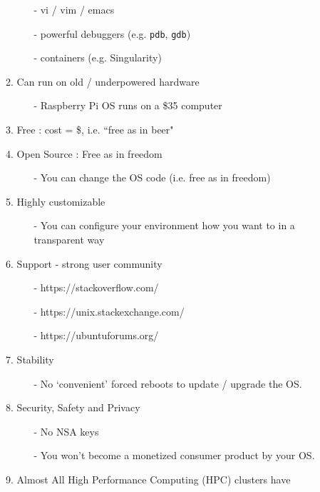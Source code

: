 \documentclass{beamer}
\newcommand{\code}[1]{\colorbox{codegray}{\texttt{#1}}}
\begin{document}
\begin{frame}
\begin{itemize}
\begin{enumerate}
\begin{itemize}
            \item[-] vi / vim / emacs
            \pause
            \item[-] powerful debuggers (e.g. \code{pdb}, \code{gdb})
            \pause
            \item[-] containers (e.g. Singularity)
        \end{itemize}
        \pause
        \item Can run on old / underpowered hardware
        \begin{itemize}
            \item[-] Raspberry Pi OS runs on a \$35 computer
        \end{itemize}
        \pause
        \item Free : cost = \$, i.e. ``free as in beer"
        \pause
        \item Open Source : Free as in freedom 
        \begin{itemize}
            \item[-] You can change the OS code (i.e. free as in freedom)
        \end{itemize}
        \pause
        \item Highly customizable
        \begin{itemize}
            \item[-] You can configure your environment how you want to in a transparent way
        \end{itemize}
        \pause
        \item Support - strong user community
        \begin{itemize}
            \item[-] https://stackoverflow.com/
            \pause
            \item[-] https://unix.stackexchange.com/
            \pause
            \item[-] https://ubuntuforums.org/
        \end{itemize}
        \pause
        \item Stability
        \begin{itemize}
            \item[-] No `convenient' forced reboots to update / upgrade the OS.
        \end{itemize}
        \item Security, Safety and Privacy
        \begin{itemize}
            \item[-] No NSA keys
            \item[-] You won't become a monetized consumer product by your OS.
        \end{itemize}
        \item Almost All High Performance Computing (HPC) clusters have 
    \end{enumerate}
\end{itemize}
\end{frame}
\end{document}
